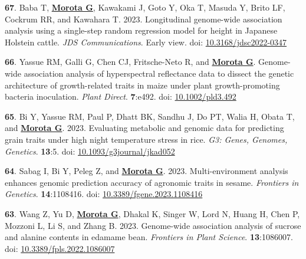 \documentclass[margin,line,10pt]{res}
\newenvironment{list1}{
  \begin{list}{\ding{113}}{%
      \setlength{\itemsep}{0in}
      \setlength{\parsep}{0in} \setlength{\parskip}{0in}
      \setlength{\topsep}{0in} \setlength{\partopsep}{0in} 
      \setlength{\leftmargin}{0.17in}}}{\end{list}}
\begin{document}
\begin{resume}
\begin{list1}
      \vspace{0.5cm}

  \item  [{\bf 67}.] Baba T, \textbf{\underline{Morota G}}, Kawakami J, Goto Y, Oka T, Masuda Y, Brito LF, Cockrum RR, and Kawahara T. 2023. Longitudinal genome-wide association analysis using a single-step random regression model for height in Japanese Holstein cattle.  \emph{JDS Communications}. Early view. doi: \textcolor{blue}{\href{https://doi.org/10.3168/jdsc2022-0347}{10.3168/jdsc2022-0347}} 


  \vspace{0.5cm}

  \item [{\bf 66}.] Yassue RM, Galli G, Chen CJ, Fritsche-Neto R, and \textbf{\underline{Morota G}}.  Genome-wide association analysis of hyperspectral reflectance data to dissect the genetic architecture of growth-related traits in maize under plant growth-promoting bacteria inoculation. \emph{Plant Direct}. \textbf{7}:e492. doi: \textcolor{blue}{\href{https://doi.org/10.1002/pld3.492}{10.1002/pld3.492}}  

  \vspace{0.5cm}

  \item [{\bf 65}.] Bi Y, Yassue RM, Paul P, Dhatt BK, Sandhu J, Do PT, Walia H, Obata T, and \textbf{\underline{Morota G}}. 2023. Evaluating metabolic and genomic data for predicting grain traits under high night temperature stress in rice. \emph{G3: Genes, Genomes, Genetics}. \textbf{13}:5. doi: \textcolor{blue}{\href{https://doi.org/10.1093/g3journal/jkad052}{10.1093/g3journal/jkad052}}  

  \vspace{0.5cm}

  \item [{\bf 64}.] Sabag I, Bi Y, Peleg Z, and \textbf{\underline{Morota G}}. 2023. Multi-environment analysis enhances genomic prediction accuracy of agronomic traits in sesame. \emph{Frontiers in Genetics}. \textbf{14}:1108416. doi: \textcolor{blue}{\href{https://doi.org/10.3389/fgene.2023.1108416}{10.3389/fgene.2023.1108416}}  

     \vspace{0.5cm}

  \item  [{\bf 63}.] Wang Z, Yu D, \textbf{\underline{Morota G}}, Dhakal K, Singer W, Lord N, Huang H, Chen P, Mozzoni L, Li S, and Zhang B. 2023. Genome-wide association analysis of sucrose and alanine contents in edamame bean. \emph{Frontiers in Plant Science}. \textbf{13}:1086007. doi: \textcolor{blue}{\href{10.3389/fpls.2022.1086007}{10.3389/fpls.2022.1086007}}  


\end{list1}
\end{resume}
\end{document}
